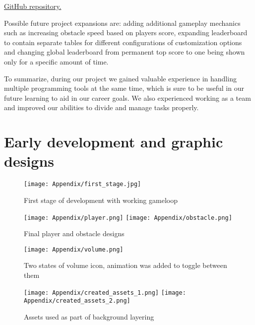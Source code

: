 \documentclass[oneside,a4paper,11pt]{report}
\begin{document}
\underline{\href{https://github.com/RadziooT/Cyberventure}{GitHub repository}.} 

\hfill

\par
Possible future project expansions are: adding additional gameplay mechanics such as increasing obstacle speed based on players score, expanding leaderboard to contain separate tables for different configurations of customization options and changing global leaderboard from permanent top score to one being shown only for a specific amount of time.

\par
To summarize, during our project we gained valuable experience in handling multiple programming tools at the same time, which is sure to be useful in our future learning to aid in our career goals. We also experienced working as a team and improved our abilities to divide and manage tasks properly.


\newpage
{}
{}



\newpage
\newpage
{}

\appendix
\chapter{Early development and graphic designs}

\begin{figure}[!htb]
	\centering
	\texttt{[image: Appendix/first\_stage.jpg]}
	\caption{First stage of development with working gameloop}
\end{figure}

\begin{figure}[!htb]
	\centering
	\texttt{[image: Appendix/player.png]}
	\texttt{[image: Appendix/obstacle.png]}
	\caption{Final player and obstacle designs}
\end{figure}

\begin{figure}
	\centering
	\texttt{[image: Appendix/volume.png]}
	\caption{Two states of volume icon, animation was added to toggle between them}
\end{figure}

\begin{figure}
	\centering
	\texttt{[image: Appendix/created\_assets\_1.png]}
	\texttt{[image: Appendix/created\_assets\_2.png]}
	\caption{Assets used as part of background layering}
\end{figure}
\end{document}
